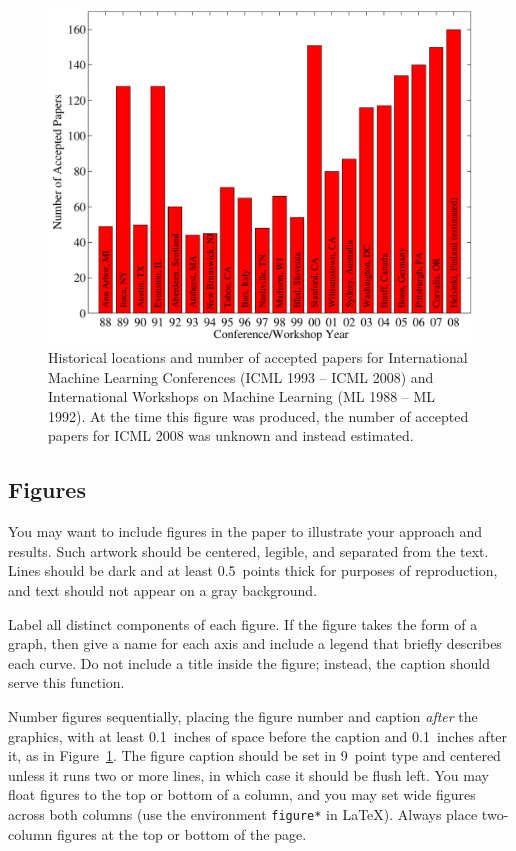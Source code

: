 \documentclass{article}
\begin{document}
\begin{figure}[ht]
\vskip 0.2in
\begin{center}
\centerline{\includegraphics[width=\columnwidth]{icml_numpapers}}
\caption{Historical locations and number of accepted papers for International
Machine Learning Conferences (ICML 1993 -- ICML 2008) and International
Workshops on Machine Learning (ML 1988 -- ML 1992). At the time this figure was
produced, the number of accepted papers for ICML 2008 was unknown and instead
estimated.}
\label{icml-historical}
\end{center}
\vskip -0.2in
\end{figure}

\subsection{Figures}

You may want to include figures in the paper to illustrate
your approach and results. Such artwork should be centered,
legible, and separated from the text. Lines should be dark and at
least 0.5~points thick for purposes of reproduction, and text should
not appear on a gray background.

Label all distinct components of each figure. If the figure takes the
form of a graph, then give a name for each axis and include a legend
that briefly describes each curve. Do not include a title inside the
figure; instead, the caption should serve this function.

Number figures sequentially, placing the figure number and caption
\emph{after} the graphics, with at least 0.1~inches of space before
the caption and 0.1~inches after it, as in
Figure~\ref{icml-historical}. The figure caption should be set in
9~point type and centered unless it runs two or more lines, in which
case it should be flush left. You may float figures to the top or
bottom of a column, and you may set wide figures across both columns
(use the environment \texttt{figure*} in \LaTeX). Always place
two-column figures at the top or bottom of the page.
\end{document}

